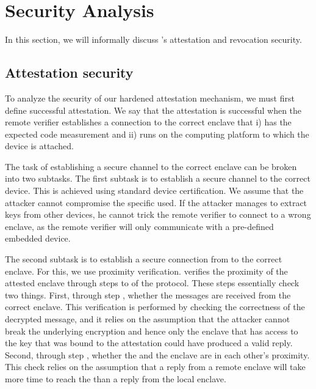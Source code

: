 \section{Security Analysis}
\label{sec:security_proximitee}

In this section, we will informally discuss \name{}'s attestation and revocation security. 
\subsection{Attestation security}

To analyze the security of our hardened attestation mechanism, we must first define successful attestation. We say that the attestation is successful when the remote verifier establishes a connection to the correct enclave that i) has the expected code measurement and ii) runs on the computing platform to which the \device device is attached.


The task of establishing a secure channel to the correct enclave can be broken into two subtasks. The first subtask is to establish a secure channel to the correct \device device. This is achieved using standard device certification. We assume that the attacker cannot compromise the specific \device used. If the attacker manages to extract keys from other \device devices, he cannot trick the remote verifier to connect to a wrong enclave, as the remote verifier will only communicate with a pre-defined embedded device.




The second subtask is to establish a secure connection from \device to the correct enclave. For this, we use proximity verification. \device verifies the proximity of the attested enclave through steps \five to \eight of the protocol. These steps essentially check two things. First, through step \seven, whether the messages are received from the correct enclave. This verification is performed by checking the correctness of the decrypted message, and it relies on the assumption that the attacker cannot break the underlying encryption and hence only the enclave that has access to the key that was bound to the attestation could have produced a valid reply. Second, through step \eight, whether the \device and the enclave are in each other's proximity. This check relies on the assumption that a reply from a remote enclave will take more time to reach the \device than a reply from the local enclave.

